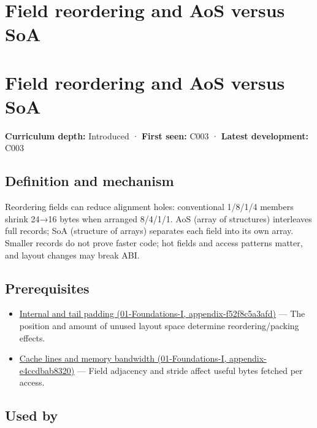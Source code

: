 \hypertarget{appendix-5522ad176ca0}{}
\section*{Field reordering and AoS versus SoA}
\section{Field reordering and AoS versus SoA}\label{appendix-5522ad176ca0-field-reordering-and-aos-versus-soa}

\textbf{Curriculum depth:} Introduced · \textbf{First seen:} C003 · \textbf{Latest development:} C003

\subsection{Definition and mechanism}\label{appendix-5522ad176ca0-definition-and-mechanism}

Reordering fields can reduce alignment holes: conventional 1/8/1/4 members shrink 24→16 bytes when arranged 8/4/1/1. AoS (array of structures) interleaves full records; SoA (structure of arrays) separates each field into its own array. Smaller records do not prove faster code; hot fields and access patterns matter, and layout changes may break ABI.

\subsection{Prerequisites}\label{appendix-5522ad176ca0-prerequisites}

\begin{itemize}
\tightlist
\item
  \href{../01-Foundations-I/main.pdf\#nameddest=appendix-f52f8c5a3afd}{Internal and tail padding (01-Foundations-I, appendix-f52f8c5a3afd)} --- The position and amount of unused layout space determine reordering/packing effects.
\item
  \href{../01-Foundations-I/main.pdf\#nameddest=appendix-e4ccdbab8320}{Cache lines and memory bandwidth (01-Foundations-I, appendix-e4ccdbab8320)} --- Field adjacency and stride affect useful bytes fetched per access.
\end{itemize}

\subsection{Used by}\label{appendix-5522ad176ca0-used-by}

